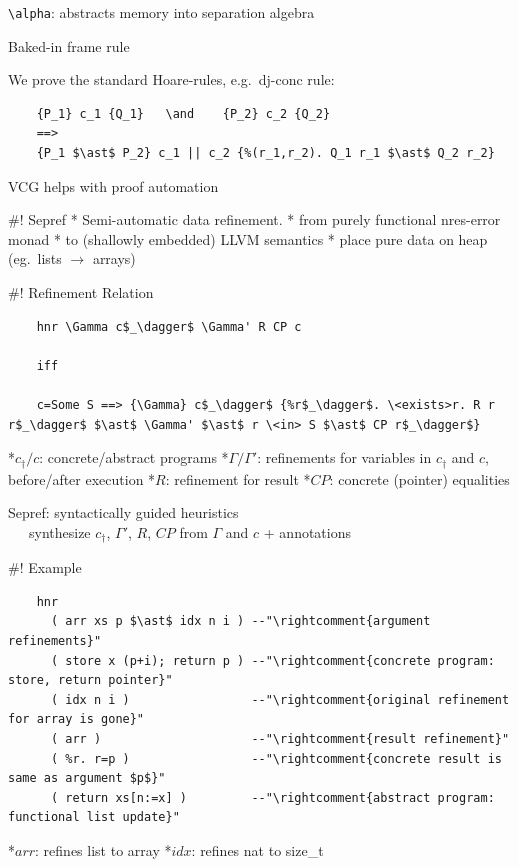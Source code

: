 \documentclass[fleqn]{beamer}
\begin{document}
  \lstinline{\alpha}: abstracts memory into separation algebra

  Baked-in frame rule

  \pause
  We prove the standard Hoare-rules, e.g.\ dj-conc rule:
  \begin{lstlisting}
    {P_1} c_1 {Q_1}   \and    {P_2} c_2 {Q_2}
    ==>
    {P_1 $\ast$ P_2} c_1 || c_2 {%(r_1,r_2). Q_1 r_1 $\ast$ Q_2 r_2}
  \end{lstlisting}

  \pause
  VCG helps with proof automation

#! Sepref
  * Semi-automatic data refinement.
    * from purely functional nres-error monad
    * to (shallowly embedded) LLVM semantics
    * place pure data on heap (eg.\ lists $\to$ arrays)

#! Refinement Relation

  \begin{lstlisting}
    hnr \Gamma c$_\dagger$ \Gamma' R CP c

    iff

    c=Some S ==> {\Gamma} c$_\dagger$ {%r$_\dagger$. \<exists>r. R r r$_\dagger$ $\ast$ \Gamma' $\ast$ r \<in> S $\ast$ CP r$_\dagger$}
  \end{lstlisting}

  *{$c_\dagger / c$}: concrete/abstract programs
  *{$\Gamma / \Gamma'$}: refinements for variables in $c_\dagger$ and $c$, before/after execution
  *{$R$}: refinement for result
  *{$CP$}: concrete (pointer) equalities

  \vfill

  Sepref: syntactically guided heuristics\\
    ~~~synthesize $c_\dagger$, $\Gamma'$, $R$, $CP$ from $\Gamma$ and $c$ + annotations


#! Example
  \begin{lstlisting}
    hnr
      ( arr xs p $\ast$ idx n i ) --"\rightcomment{argument refinements}"
      ( store x (p+i); return p ) --"\rightcomment{concrete program: store, return pointer}"
      ( idx n i )                 --"\rightcomment{original refinement for array is gone}"
      ( arr )                     --"\rightcomment{result refinement}"
      ( %r. r=p )                 --"\rightcomment{concrete result is same as argument $p$}"
      ( return xs[n:=x] )         --"\rightcomment{abstract program: functional list update}"
  \end{lstlisting}

  *$arr$: refines list to array
  *$idx$: refines nat to size\_t
\end{document}
